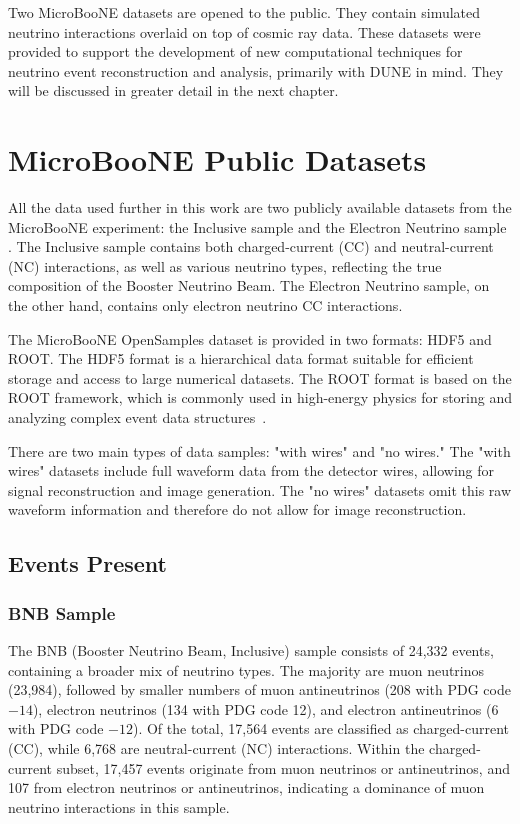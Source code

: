 \documentclass{pracalicmgr}
\begin{document}
Two MicroBooNE datasets are opened to the public. They contain simulated neutrino interactions overlaid on top of cosmic ray data. These datasets were provided to support the development of new computational techniques for neutrino event reconstruction and analysis, primarily with DUNE in mind. They will be discussed in greater detail in the next chapter.

\chapter{MicroBooNE Public Datasets}

All the data used further in this work are two publicly available datasets from the MicroBooNE experiment: the Inclusive sample and the Electron Neutrino sample \cite{ubooneOpenSamples}. The Inclusive sample contains both charged-current (CC) and neutral-current (NC) interactions, as well as various neutrino types, reflecting the true composition of the Booster Neutrino Beam. The Electron Neutrino sample, on the other hand, contains only electron neutrino CC interactions.

The MicroBooNE OpenSamples dataset is provided in two formats: HDF5 and ROOT. The HDF5 format is a hierarchical data format suitable for efficient storage and access to large numerical datasets. The ROOT format is based on the ROOT framework, which is commonly used in high-energy physics for storing and analyzing complex event data structures~\cite{hdf5,root}. 

There are two main types of data samples: "with wires" and "no wires." The "with wires" datasets include full waveform data from the detector wires, allowing for signal reconstruction and image generation. The "no wires" datasets omit this raw waveform information and therefore do not allow for image reconstruction.

\section{Events Present}

\subsection{BNB Sample}

The BNB (Booster Neutrino Beam, Inclusive) sample consists of 24,332 events, containing a broader mix of neutrino types. The majority are muon neutrinos (23,984), followed by smaller numbers of muon antineutrinos (208 with PDG code $-14$), electron neutrinos (134 with PDG code 12), and electron antineutrinos (6 with PDG code $-12$). Of the total, 17,564 events are classified as charged-current (CC), while 6,768 are neutral-current (NC) interactions. Within the charged-current subset, 17,457 events originate from muon neutrinos or antineutrinos, and 107 from electron neutrinos or antineutrinos, indicating a dominance of muon neutrino interactions in this sample.
\end{document}
